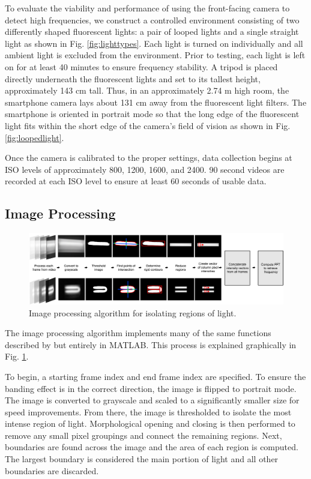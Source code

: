 \documentclass[conference]{IEEEtran}
\begin{document}
To evaluate the viability and performance of using the front-facing camera to detect high frequencies, we construct a controlled environment consisting of two differently shaped fluorescent lights: a pair of looped lights and a single straight light as shown in Fig. \ref{fig:lighttypes}. Each light is turned on individually and all ambient light is excluded from the environment. Prior to testing, each light is left on for at least 40 minutes to ensure frequency stability. A tripod is placed directly underneath the fluorescent lights and set to its tallest height, approximately 143 cm tall. Thus, in an approximately 2.74 m high room, the smartphone camera lays about 131 cm away from the fluorescent light filters. The smartphone is oriented in portrait mode so that the long edge of the fluorescent light fits within the short edge of the camera's field of vision as shown in Fig. \ref{fig:loopedlight}.

Once the camera is calibrated to the proper settings, data collection begins at ISO levels of approximately 800, 1200, 1600, and 2400. 90 second videos are recorded at each ISO level to ensure at least 60 seconds of usable data.

\subsection{Image Processing }\label{section:imageprocessing}

\begin{figure}
	\begin{center}
	\includegraphics[width=1\textwidth]{figures/diagram.jpg}
	 \caption{Image processing algorithm for isolating regions of light.}\label{fig:diagram}
	 \end{center}
\end{figure}

The image processing algorithm implements many of the same functions described by \cite{zhang2016litell} but entirely in MATLAB. This process is explained graphically in Fig. \ref{fig:diagram}. 

To begin, a starting frame index and end frame index are specified. To ensure the banding effect is in the correct direction, the image is flipped to portrait mode. The image is converted to grayscale and scaled to a significantly smaller size for speed improvements. From there, the image is thresholded to isolate the most intense region of light. Morphological opening and closing is then performed to remove any small pixel groupings and connect the remaining regions. Next, boundaries are found across the image and the area of each region is computed. The largest boundary is considered the main portion of  light and all other boundaries are discarded.
\end{document}
